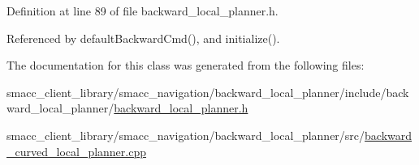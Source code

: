 Definition at line 89 of file backward\+\_\+local\+\_\+planner.\+h.



Referenced by default\+Backward\+Cmd(), and initialize().



The documentation for this class was generated from the following files\+:\begin{DoxyCompactItemize}
\item 
smacc\+\_\+client\+\_\+library/smacc\+\_\+navigation/backward\+\_\+local\+\_\+planner/include/backward\+\_\+local\+\_\+planner/\hyperlink{backward__local__planner_8h}{backward\+\_\+local\+\_\+planner.\+h}\item 
smacc\+\_\+client\+\_\+library/smacc\+\_\+navigation/backward\+\_\+local\+\_\+planner/src/\hyperlink{backward__curved__local__planner_8cpp}{backward\+\_\+curved\+\_\+local\+\_\+planner.\+cpp}\end{DoxyCompactItemize}
